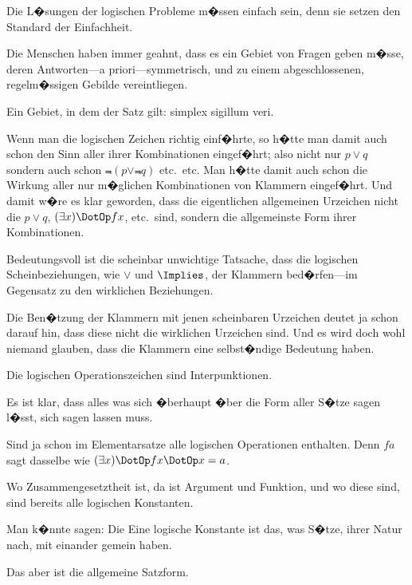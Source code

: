 {Die L�sungen der logischen Probleme m�ssen
einfach sein, denn sie setzen den Standard der
Einfachheit.

Die Menschen haben immer geahnt, dass es ein
Gebiet von Fragen geben m�sse, deren Antworten---a
priori---symmetrisch, und zu einem abgeschlossenen,
regelm�ssigen Gebilde vereintliegen.

Ein Gebiet, in dem der Satz gilt: simplex
sigillum veri.}


{Wenn man die logischen Zeichen richtig
einf�hrte, so h�tte man damit auch schon den Sinn
aller ihrer Kombinationen eingef�hrt; also nicht
nur \glqq{}$p \lor q$\grqq{} sondern auch schon \glqq{}$\Not{(p \lor \Not{q})}$\grqq{} etc.\ etc.
Man h�tte damit auch schon die Wirkung
aller nur m�glichen Kombinationen von Klammern
eingef�hrt. Und damit w�re es klar geworden,
dass die eigentlichen allgemeinen Urzeichen nicht
die \glqq{}$p \lor q$\grqq{}, \glqq{}$(\exists x) \DotOp fx$\grqq{}, etc.\ sind, sondern die allgemeinste
Form ihrer Kombinationen.}


{Bedeutungsvoll ist die scheinbar unwichtige
Tatsache, dass die logischen Scheinbeziehungen,
wie $\lor$ und $\Implies$, der Klammern be\-d�r\-fen---im Gegensatz
zu den wirklichen Beziehungen.

Die Ben�tzung der Klammern mit jenen scheinbaren
Urzeichen deutet ja schon darauf hin, dass
diese nicht die wirklichen Urzeichen sind. Und
es wird doch wohl niemand glauben, dass die
Klammern eine selbst�ndige Bedeutung haben.}


{Die logischen Operationszeichen sind Interpunktionen.}


{Es ist klar, dass alles was sich �berhaupt  �ber die Form aller S�tze sagen
l�sst, sich  sagen lassen muss.

Sind ja schon im Elementarsatze alle logischen
\enlargethispage{1pt} %
Operationen enthalten. Denn \glqq{}$fa$\grqq{} sagt dasselbe
wie \glqq{}$(\exists x) \DotOp fx \DotOp x = a$\grqq{}.

Wo Zusammengesetztheit ist, da ist Argument
und Funktion, und wo diese sind, sind bereits alle
logischen Konstanten.

Man k�nnte sagen: Die Eine logische Konstante
ist das, was  S�tze, ihrer Natur nach, mit
einander gemein haben.

Das aber ist die allgemeine Satzform.}


